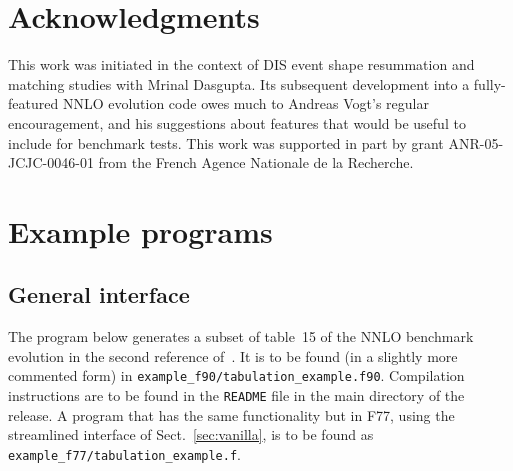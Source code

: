\documentclass[12pt]{article}
\newcommand{\ttt}[1]{\texttt{#1}}
\begin{document}
\section*{Acknowledgments}

This work was initiated in the context of DIS event shape resummation
and matching studies \cite{DisResum} with Mrinal Dasgupta. Its
subsequent development into a fully-featured NNLO evolution code owes
much to Andreas Vogt's regular encouragement, and his suggestions
about features that would be useful to include for benchmark tests.
%
This work was supported in part by grant ANR-05-JCJC-0046-01 from the
French Agence Nationale de la Recherche. 

\appendix


\section{Example programs}
\label{sec:example_program}

\subsection{General interface}

The program below generates a subset of table~15 of the NNLO benchmark
evolution in the second reference of~\cite{Benchmarks}. It is to be
found (in a slightly more commented form) in
\ttt{example\_f90/tabulation\_example.f90}. Compilation instructions
are to be found in the \ttt{README} file in the main directory of the
release. A program that has the same functionality but in F77, using
the streamlined interface of Sect.~\ref{sec:vanilla}, is to be found as
\ttt{example\_f77/tabulation\_example.f}.
\end{document}
